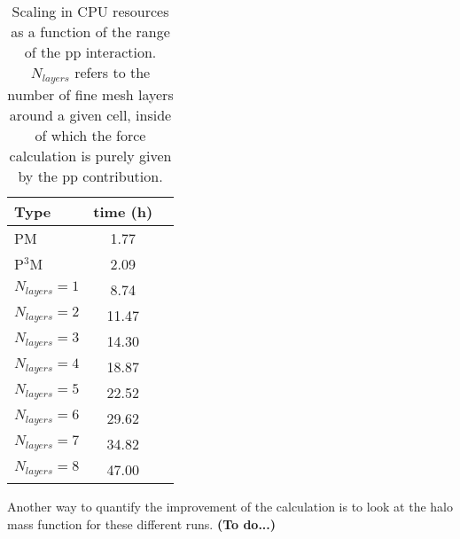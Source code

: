\begin{table}
\begin{center}
\caption{Scaling in {\small CPU} resources as a function of the range of the pp interaction.
$N_{layers}$ refers to the number of fine mesh layers around a given cell, inside of which the force calculation
is purely given by the pp contribution. }
\begin{tabular}{|l|c|c|}
\hline 
             Type         & time (h)   \\
                  \hline
PM                         & 1.77 \\
P$^{3}$M             & 2.09 \\
\hline
 $N_{layers}=1$ & 8.74 \\
 $N_{layers}=2$ & 11.47\\
 $N_{layers}=3$ & 14.30 \\
 $N_{layers}=4$ & 18.87\\
 $N_{layers}=5$ & 22.52\\
 $N_{layers}=6$ & 29.62\\
 $N_{layers}=7$ & 34.82\\
 $N_{layers}=8$ & 47.00\\
 

\hline \hline
\end{tabular}
\label{table:cpu_pp_ext}
\end{center}
\end{table}

Another way to quantify the improvement of the calculation is to look at the halo mass function for these different runs.
{\bf (To do...)}
